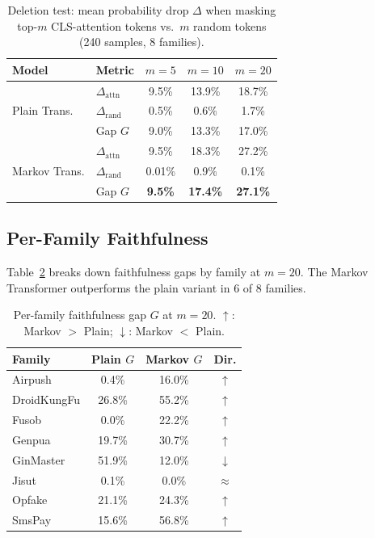 \documentclass[12pt]{report}
\begin{document}
\begin{table}[t]
\centering
\caption{Deletion test: mean probability drop $\Delta$ when masking top-$m$
  CLS-attention tokens vs.\ $m$ random tokens (240 samples, 8 families).}
\label{tab:faithfulness}
\begin{tabular}{llccc}
\toprule
\textbf{Model} & \textbf{Metric} & $m{=}5$ & $m{=}10$ & $m{=}20$ \\
\midrule
\multirow{3}{*}{Plain Trans.}
  & $\Delta_{\text{attn}}$  & 9.5\%  & 13.9\%  & 18.7\% \\
  & $\Delta_{\text{rand}}$  & 0.5\%  &  0.6\%  &  1.7\% \\
  & Gap $G$                 & 9.0\%  & 13.3\%  & 17.0\% \\
\midrule
\multirow{3}{*}{Markov Trans.}
  & $\Delta_{\text{attn}}$  & 9.5\%  & 18.3\%  & 27.2\% \\
  & $\Delta_{\text{rand}}$  & 0.01\% &  0.9\%  &  0.1\% \\
  & Gap $G$                 & \textbf{9.5\%} & \textbf{17.4\%} & \textbf{27.1\%} \\
\bottomrule
\end{tabular}
\end{table}

\subsection{Per-Family Faithfulness}

Table~\ref{tab:perfamily} breaks down faithfulness gaps by family at
$m{=}20$. The Markov Transformer outperforms the plain variant in 6 of
8 families.

\begin{table}[t]
\centering
\caption{Per-family faithfulness gap $G$ at $m{=}20$.
  $\uparrow$: Markov $>$ Plain;\; $\downarrow$: Markov $<$ Plain.}
\label{tab:perfamily}
\begin{tabular}{lccc}
\toprule
\textbf{Family} & \textbf{Plain $G$} & \textbf{Markov $G$} & \textbf{Dir.} \\
\midrule
Airpush      &  0.4\% &  16.0\% & $\uparrow$ \\
DroidKungFu  & 26.8\% &  55.2\% & $\uparrow$ \\
Fusob        &  0.0\% &  22.2\% & $\uparrow$ \\
Genpua       & 19.7\% &  30.7\% & $\uparrow$ \\
GinMaster    & 51.9\% &  12.0\% & $\downarrow$ \\
Jisut        &  0.1\% &   0.0\% & $\approx$ \\
Opfake       & 21.1\% &  24.3\% & $\uparrow$ \\
SmsPay       & 15.6\% &  56.8\% & $\uparrow$ \\
\bottomrule
\end{tabular}
\end{table}
\end{document}
